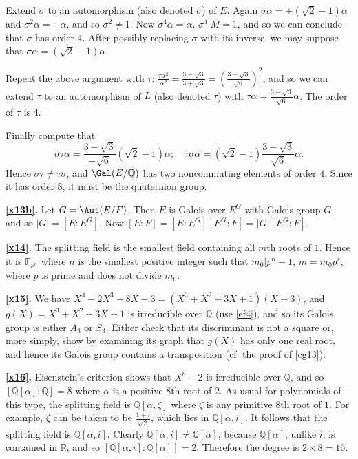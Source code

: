 \documentclass[a4paper,11pt,final,openany]{memoir}
\theoremstyle{nonumberplain}
\begin{document}
\noindent Extend $\sigma$ to an automorphism (also denoted $\sigma$) of $E$.
Again $\sigma\alpha=\pm(\sqrt2-1)\alpha$ and $\sigma^{2}\alpha=-\alpha$, and
so $\sigma^{2}\neq1$. Now $\sigma^{4}\alpha=\alpha$, $\sigma^{4}|M=1$, and so
we can conclude that $\sigma$ has order $4$. After possibly replacing $\sigma$
with its inverse, we may suppose that $\sigma\alpha=(\sqrt2-1)\alpha$.

\noindent Repeat the above argument with $\tau$: $\frac{\tau\alpha^{2}}%
{\alpha^{2}}=\frac{3-\sqrt3}{3+\sqrt3}=\left(  \frac{3-\sqrt3}{\sqrt6}\right)
^{2}$, and so we can extend $\tau$ to an automorphism of $L$ (also denoted
$\tau$) with $\tau\alpha=\frac{3-\sqrt3}{\sqrt6}\alpha$. The order of $\tau$
is $4$.

\noindent Finally compute that
\[
\sigma\tau\alpha=\frac{3-\sqrt{3}}{-\sqrt{6}}(\sqrt{2}-1)\alpha;\quad
\tau\sigma\alpha=(\sqrt{2}-1)\frac{3-\sqrt{3}}{\sqrt{6}}\alpha.
\]
Hence $\sigma\tau\neq\tau\sigma$, and $\Gal(E/{\mathbb{Q}})$ has two
noncommuting elements of order $4$. Since it has order $8$, it must be the
quaternion group.



\medskip\noindent\textbf{\ref{x13b}.} Let $G=\Aut(E/F)$. Then $E$ is Galois
over $E^{G}$ with Galois group $G$, and so $|G|=[E\colon E^{G}]$. Now
$[E\colon F]=[E\colon E^{G}][E^{G}\colon F]=|G|[E^{G}\colon F]$.

\medskip\noindent\textbf{\ref{x14}.} The splitting field is the smallest field
containing all $m$th roots of $1$. Hence it is $\mathbb{F}_{p^{n}}$ where $n$
is the smallest positive integer such that $m_{0}|p^{n}-1$, $m=m_{0}p^{r}$,
where $p$ is prime and does not divide $m_{0}$.

\medskip\noindent\textbf{\ref{x15}.} We have $X^{4}-2X^{3}-8X-3=(X^{3}%
+X^{2}+3X+1)(X-3)$, and $g(X)=X^{3}+X^{2}+3X+1$ is irreducible over
${\mathbb{Q}}$ (use \ref{ef4}), and so its Galois group is either $A_{3}$ or
$S_{3}$. Either check that its discriminant is not a square or, more simply,
show by examining its graph that $g(X)$ has only one real root, and hence its
Galois group contains a transposition (cf. the proof of \ref{cg13}).

\medskip\noindent\textbf{\ref{x16}.} Eisenstein's criterion shows that
$X^{8}-2$ is irreducible over ${\mathbb{Q}}$, and so $[{\mathbb{Q}}%
[\alpha]\colon{\mathbb{Q}}]=8$ where $\alpha$ is a positive $8$th root of $2$.
As usual for polynomials of this type, the splitting field is ${\mathbb{Q}%
}[\alpha,\zeta]$ where $\zeta$ is any primitive $8$th root of $1$. For
example, $\zeta$ can be taken to be $\frac{1+i}{\sqrt{2}}$, which lies in
${\mathbb{Q}}[\alpha,i]$. It follows that the splitting field is ${\mathbb{Q}%
}[\alpha,i]$. Clearly ${\mathbb{Q}}[\alpha,i]\neq{\mathbb{Q}}[\alpha]$,
because ${\mathbb{Q}}[\alpha]$, unlike $i$, is contained in $\mathbb{R}$, and
so $[{\mathbb{Q}}[\alpha,i]\colon{\mathbb{Q}}[\alpha]]=2$. Therefore the
degree is $2\times8=16$.
\end{document}
